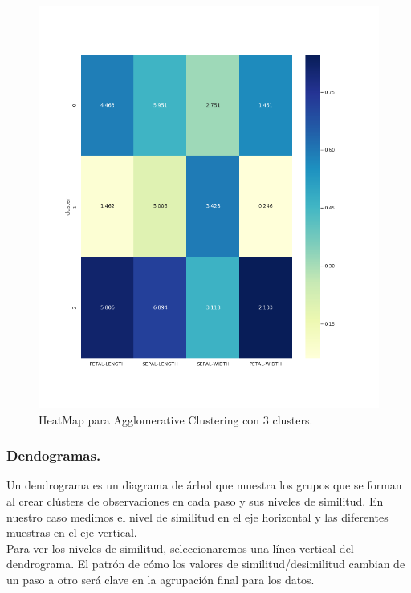 \documentclass[a4paper, 20pt]{article}
\begin{document}
\begin{figure}[h]
\centering
\includegraphics[scale=0.63]{dani/heatmapAggClusterIRIS.png}
\caption{HeatMap para Agglomerative Clustering con 3 clusters.}
\label{hmac}
\end{figure}

\clearpage

\subsubsection{Dendogramas.}

Un dendrograma es un diagrama de árbol que muestra los grupos que se forman al crear clústers de observaciones en cada paso y sus niveles de similitud. En nuestro caso medimos el nivel de similitud en el eje horizontal y las diferentes muestras en el eje vertical.\\

Para ver los niveles de similitud, seleccionaremos una línea vertical del dendrograma. El patrón de cómo los valores de similitud/desimilitud cambian de un paso a otro será clave en la agrupación final para los datos.\\
\end{document}

